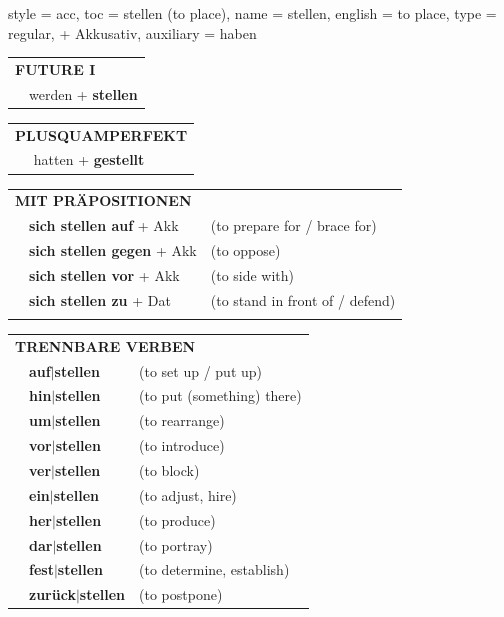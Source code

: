 \begin{verbentry}{
  style = {acc},
  toc = {stellen (to place)},
  name = {stellen},
  english = {to place},
  type = {regular, + Akkusativ},
  auxiliary = {haben}
}
\begin{tabular}{rl}
    \multicolumn{2}{l}{\textbf{FUTURE I} }\\
   & werden + \textbf{stellen}\\
 
  \end{tabular}
\hfill
   \begin{tabular}{rl}
      \multicolumn{2}{l}{\textbf{PLUSQUAMPERFEKT}}\\
   & hatten + \textbf{gestellt}\\
  \end{tabular}
  
\vspace{10pt}

   \begin{tabular}{lll}
      \multicolumn{3}{l}{\textbf{MIT PRÄPOSITIONEN}}\\
&\textbf{sich stellen auf} + Akk & (to prepare for / brace for)\\
& \textbf{sich stellen gegen} + Akk & (to oppose)\\
& \textbf{sich stellen vor} + Akk & (to side with)\\
&\textbf{sich stellen zu} + Dat & (to stand in front of / defend)\\
\vspace{60pt}
  \end{tabular}
  \hfill
   \begin{tabular}{lll}
      \multicolumn{3}{l}{\textbf{TRENNBARE VERBEN}}\\
 & \textbf{auf$|$stellen} & (to set up / put up)\\
&\textbf{hin$|$stellen} & (to put (something) there)\\
&\textbf{um$|$stellen} & (to rearrange)\\
&\textbf{vor$|$stellen} & (to introduce)\\
&\textbf{ver$|$stellen} & (to block)\\
&\textbf{ein$|$stellen} & (to adjust, hire)\\
&\textbf{her$|$stellen} & (to produce)\\
&\textbf{dar$|$stellen} & (to portray)\\
&\textbf{fest$|$stellen} & (to determine, establish)\\
&\textbf{zurück$|$stellen} & (to postpone)
  \end{tabular}


  \vspace{-5pt}
\end{verbentry}

